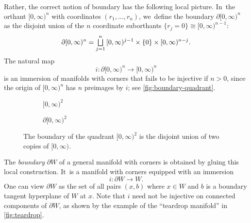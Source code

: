 \documentclass[10pt]{amsart}
\let\oldbigsqcup\bigsqcup
\renewcommand{\bigsqcup}{\mathop{\textstyle\oldbigsqcup}\displaylimits}
\theoremstyle{definition}
\theoremstyle{remark}
\let\defn\emph
\newcommand{\halfspc}[1]{[0,\infty)^{#1}}
\begin{document}
Rather, the correct notion of boundary has the following local picture. In~the orthant $\halfspc{n}$ with coordinates $(r_1,\ldots,r_n)$, we~define the boundary $\partial\halfspc{n}$ as the disjoint union of the $n$ coordinate suborthants $\{r_j=0\}\cong \halfspc{n-1}$:
\[
\partial\halfspc{n} = \bigsqcup_{j=1}^n\,\halfspc{j-1}\times\{0\}\times \halfspc{n-j}.
\]
The natural map
\[
i\colon \partial\halfspc{n}\to \halfspc{n}
\]
is an immersion of manifolds with corners that fails to be injective if $n>0$, since the origin of $\halfspc{n}$ has $n$ preimages by $i$; see \autoref{fig:boundary-quadrant}.

\begin{figure}
\centering
\begin{subfigure}[t]{0.3\textwidth}
\centering
{}
\caption{$\halfspc{2}$}
\end{subfigure}
\begin{subfigure}[t]{0.3\textwidth}
\centering
{}
\caption{$\partial \halfspc{2}$}
\end{subfigure}
\caption{The boundary of the quadrant $\halfspc{2}$ is the disjoint union of two copies of $\halfspc{}$.}
\label{fig:boundary-quadrant}
\end{figure}

The \defn{boundary} $\partial W$ of a general manifold with corners is obtained by gluing this local construction. It~is a manifold with corners equipped with an immersion
\[
i\colon \partial W\to W.
\]
One can view $\partial W$ as the set of all pairs $(x,b)$ where $x\in W$ and $b$ is a boundary tangent hyperplane of $ W$ at $x$. Note that $i$ need not be injective on connected components of $\partial W$, as shown by the example of the ``teardrop manifold'' in \autoref{fig:teardrop}.
\end{document}
